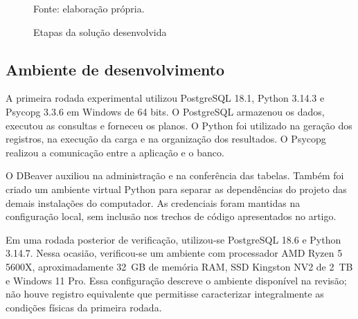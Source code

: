 \documentclass{UNESC}
\newcommand{\fonteautor}{
    \par\smallskip
    {\footnotesize Fonte: elaboração própria.}
}
\begin{document}
\begin{figure}[H]
\centering
\caption{Etapas da solução desenvolvida}
\label{fig:fluxo}
\fonteautor
\end{figure}

\subsection{Ambiente de desenvolvimento}

A primeira rodada experimental utilizou PostgreSQL 18.1, Python 3.14.3 e Psycopg 3.3.6 em Windows de 64 bits. O PostgreSQL armazenou os dados, executou as consultas e forneceu os planos. O Python foi utilizado na geração dos registros, na execução da carga e na organização dos resultados. O Psycopg realizou a comunicação entre a aplicação e o banco.

O DBeaver auxiliou na administração e na conferência das tabelas. Também foi criado um ambiente virtual Python para separar as dependências do projeto das demais instalações do computador. As credenciais foram mantidas na configuração local, sem inclusão nos trechos de código apresentados no artigo.

Em uma rodada posterior de verificação, utilizou-se PostgreSQL 18.6 e Python 3.14.7. Nessa ocasião, verificou-se um ambiente com processador AMD Ryzen 5 5600X, aproximadamente 32~GB de memória RAM, SSD Kingston NV2 de 2~TB e Windows 11 Pro. Essa configuração descreve o ambiente disponível na revisão; não houve registro equivalente que permitisse caracterizar integralmente as condições físicas da primeira rodada.
\end{document}
